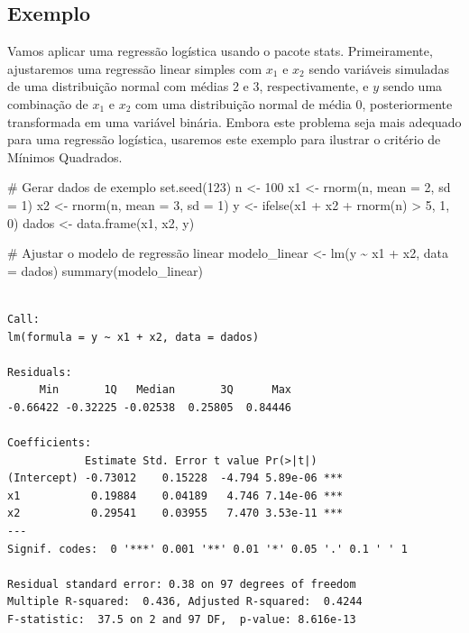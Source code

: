 \documentclass[
  a4paperpaper,
]{article}
\newenvironment{Shaded}{\begin{snugshade}}{\end{snugshade}}
\newcommand{\AttributeTok}[1]{\textcolor[rgb]{0.40,0.45,0.13}{#1}}
\newcommand{\CommentTok}[1]{\textcolor[rgb]{0.37,0.37,0.37}{#1}}
\newcommand{\DecValTok}[1]{\textcolor[rgb]{0.68,0.00,0.00}{#1}}
\newcommand{\FunctionTok}[1]{\textcolor[rgb]{0.28,0.35,0.67}{#1}}
\newcommand{\NormalTok}[1]{\textcolor[rgb]{0.00,0.23,0.31}{#1}}
\newcommand{\OtherTok}[1]{\textcolor[rgb]{0.00,0.23,0.31}{#1}}
\newcommand{\SpecialCharTok}[1]{\textcolor[rgb]{0.37,0.37,0.37}{#1}}
\begin{document}
\subsection{Exemplo}\label{exemplo-4}

Vamos aplicar uma regressão logística usando o pacote stats.
Primeiramente, ajustaremos uma regressão linear simples com \(x_1\) e
\(x_2\) sendo variáveis simuladas de uma distribuição normal com médias
2 e 3, respectivamente, e \(y\) sendo uma combinação de \(x_1\) e
\(x_2\) com uma distribuição normal de média 0, posteriormente
transformada em uma variável binária. Embora este problema seja mais
adequado para uma regressão logística, usaremos este exemplo para
ilustrar o critério de Mínimos Quadrados.

\begin{Shaded}
\begin{Highlighting}[]
\CommentTok{\# Gerar dados de exemplo}
\FunctionTok{set.seed}\NormalTok{(}\DecValTok{123}\NormalTok{)}
\NormalTok{n }\OtherTok{\textless{}{-}} \DecValTok{100}
\NormalTok{x1 }\OtherTok{\textless{}{-}} \FunctionTok{rnorm}\NormalTok{(n, }\AttributeTok{mean =} \DecValTok{2}\NormalTok{, }\AttributeTok{sd =} \DecValTok{1}\NormalTok{)}
\NormalTok{x2 }\OtherTok{\textless{}{-}} \FunctionTok{rnorm}\NormalTok{(n, }\AttributeTok{mean =} \DecValTok{3}\NormalTok{, }\AttributeTok{sd =} \DecValTok{1}\NormalTok{)}
\NormalTok{y }\OtherTok{\textless{}{-}} \FunctionTok{ifelse}\NormalTok{(x1 }\SpecialCharTok{+}\NormalTok{ x2 }\SpecialCharTok{+} \FunctionTok{rnorm}\NormalTok{(n) }\SpecialCharTok{\textgreater{}} \DecValTok{5}\NormalTok{, }\DecValTok{1}\NormalTok{, }\DecValTok{0}\NormalTok{)}
\NormalTok{dados }\OtherTok{\textless{}{-}} \FunctionTok{data.frame}\NormalTok{(x1, x2, y)}

\CommentTok{\# Ajustar o modelo de regressão linear}
\NormalTok{modelo\_linear }\OtherTok{\textless{}{-}} \FunctionTok{lm}\NormalTok{(y }\SpecialCharTok{\textasciitilde{}}\NormalTok{ x1 }\SpecialCharTok{+}\NormalTok{ x2, }\AttributeTok{data =}\NormalTok{ dados)}
\FunctionTok{summary}\NormalTok{(modelo\_linear)}
\end{Highlighting}
\end{Shaded}

\begin{verbatim}

Call:
lm(formula = y ~ x1 + x2, data = dados)

Residuals:
     Min       1Q   Median       3Q      Max 
-0.66422 -0.32225 -0.02538  0.25805  0.84446 

Coefficients:
            Estimate Std. Error t value Pr(>|t|)    
(Intercept) -0.73012    0.15228  -4.794 5.89e-06 ***
x1           0.19884    0.04189   4.746 7.14e-06 ***
x2           0.29541    0.03955   7.470 3.53e-11 ***
---
Signif. codes:  0 '***' 0.001 '**' 0.01 '*' 0.05 '.' 0.1 ' ' 1

Residual standard error: 0.38 on 97 degrees of freedom
Multiple R-squared:  0.436, Adjusted R-squared:  0.4244 
F-statistic:  37.5 on 2 and 97 DF,  p-value: 8.616e-13
\end{verbatim}
\end{document}
